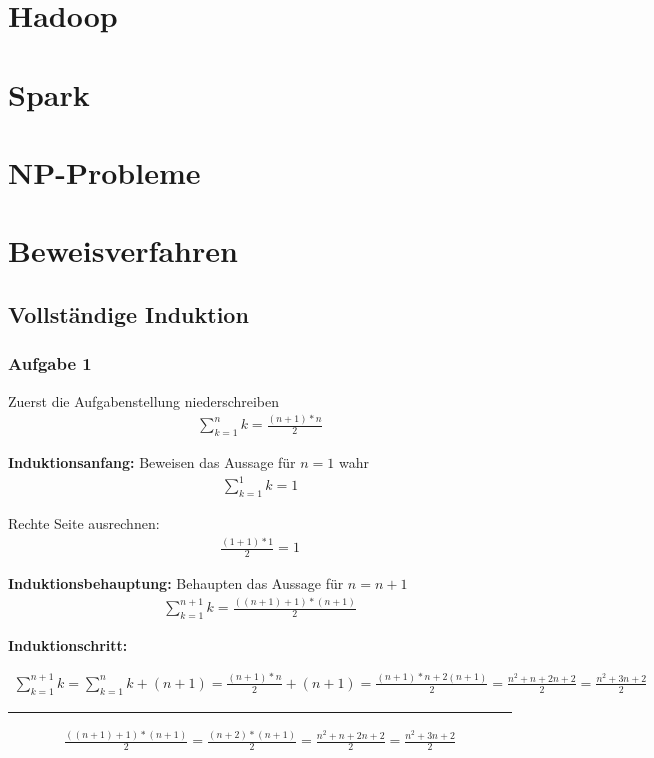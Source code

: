 \documentclass{article}
\begin{document}
\section{Hadoop}

\section{Spark}

\section{NP-Probleme}

\section{Beweisverfahren}

\subsection{Vollständige Induktion}


\subsubsection{Aufgabe 1}

\noindent Zuerst die Aufgabenstellung niederschreiben
\begin{align*}
    \sum_{k=1}^{n}k = \frac{(n + 1) * n}{2}
\end{align*}


\noindent \textbf{Induktionsanfang:} Beweisen das Aussage für $ n  = 1 $ wahr 
\begin{align*}
    \sum_{k=1}^{1}k = 1
\end{align*}

\noindent Rechte Seite ausrechnen:
\begin{align*}
    \frac{(1 + 1) * 1}{2} = 1
\end{align*}


\noindent \textbf{Induktionsbehauptung:} Behaupten das Aussage für $ n = n + 1 $
\begin{align*}
    \sum_{k=1}^{n + 1}k = \frac{((n + 1) + 1) * (n + 1)}{2}
\end{align*}

\noindent \textbf{Induktionschritt:}

\begin{align*}
    \sum_{k=1}^{n + 1}k  = \sum_{k=1}^{n}k + (n + 1) = \frac{(n + 1) * n}{2} +  (n + 1) = \frac{(n + 1) * n + 2(n + 1)}{2} = \frac{n^2 + n + 2n + 2}{2} = \frac{n^2 + 3n + 2}{2}
\end{align*}
\hrule
\begin{align*}
    \frac{((n + 1) + 1) * (n + 1)}{2} = \frac{(n + 2) * (n + 1)}{2} = \frac{n^2 + n +2n + 2}{2} = \frac{n^2 + 3n + 2}{2}
\end{align*}
\end{document}
